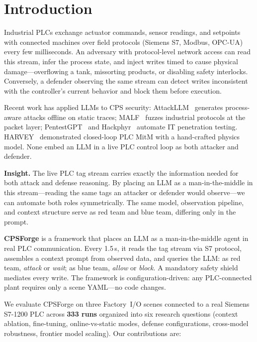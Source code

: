 \section{Introduction}
\label{sec:intro}

Industrial PLCs exchange actuator commands, sensor readings, and setpoints with connected machines over field protocols (Siemens S7, Modbus, OPC-UA) every few milliseconds. An adversary with protocol-level network access can read this stream, infer the process state, and inject writes timed to cause physical damage---overflowing a tank, missorting products, or disabling safety interlocks. Conversely, a defender observing the same stream can detect writes inconsistent with the controller's current behavior and block them before execution.

Recent work has applied LLMs to CPS security: AttackLLM~\cite{ahmed2025attackllm} generates process-aware attacks offline on static traces; MALF~\cite{ning2025malf} fuzzes industrial protocols at the packet layer; PentestGPT~\cite{deng2024pentestgpt} and Hackphyr~\cite{rigaki2024hackphyr} automate IT penetration testing. HARVEY~\cite{garcia2017harvey} demonstrated closed-loop PLC MitM with a hand-crafted physics model. None embed an LLM in a live PLC control loop as both attacker and defender.

\textbf{Insight.} The live PLC tag stream carries exactly the information needed for both attack and defense reasoning. By placing an LLM as a man-in-the-middle in this stream---reading the same tags an attacker or defender would observe---we can automate both roles symmetrically. The same model, observation pipeline, and context structure serve as red team and blue team, differing only in the prompt.

\textbf{CPSForge} is a framework that places an LLM as a man-in-the-middle agent in real PLC communication. Every 1.5\,s, it reads the tag stream via S7 protocol, assembles a context prompt from observed data, and queries the LLM: as red team, \emph{attack} or \emph{wait}; as blue team, \emph{allow} or \emph{block}. A mandatory safety shield mediates every write. The framework is configuration-driven: any PLC-connected plant requires only a scene YAML---no code changes.

We evaluate CPSForge on three Factory~I/O scenes connected to a real Siemens S7-1200 PLC across \textbf{333 runs} organized into six research questions (context ablation, fine-tuning, online-vs-static modes, defense configurations, cross-model robustness, frontier model scaling). Our contributions are:


